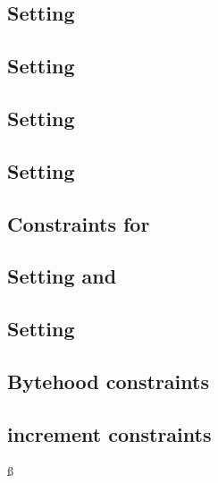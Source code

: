 \subsection{Setting \indexMax{}                            \lispTodo{}}    \label{bls: generalities: setting index max}                  
\subsection{Setting \blsTotalSize{}                        \lispTodo{}}    \label{bls: generalities: setting total size}                 
\subsection{Setting \blsIndex{}                            \lispTodo{}}    \label{bls: generalities: setting index}                      
\subsection{Setting           \maxCt{}                     \lispTodo{}}    \label{bls: generalities: setting ct_max}                     
\subsection{Constraints for \ct{}                          \lispTodo{}}    \label{bls: generalities: setting ct}                         
\subsection{Setting \isFirstInput{} and \isSecondInput{}   \lispTodo{}}    \label{bls: generalities: setting is_first and is_second}     
\subsection{Setting \accInputs{}                           \lispTodo{}}    \label{bls: generalities: setting acc pairings}               
\subsection{Bytehood constraints                           \lispTodo{}}    \label{bls: generalities: bytehood and accumulator}           
\subsection{\blsId{} increment constraints                 \lispTodo{}}    \label{bls: generalities: stamp increments}                   ß
